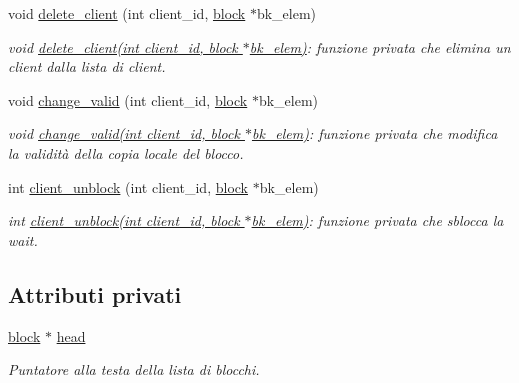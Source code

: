 \begin{CompactItemize}
void \hyperlink{classServer_5e5b37ba00ab28b4a1d1ed83bbc16e6b_5e5b37ba00ab28b4a1d1ed83bbc16e6b}{delete\_\-client} (int client\_\-id, \hyperlink{structblock}{block} $\ast$bk\_\-elem)
\begin{CompactList}\small\item\em void \hyperlink{classServer_5e5b37ba00ab28b4a1d1ed83bbc16e6b_5e5b37ba00ab28b4a1d1ed83bbc16e6b}{delete\_\-client(int client\_\-id, block $\ast$bk\_\-elem)}: funzione privata che elimina un client dalla lista di client. \item\end{CompactList}\item 
void \hyperlink{classServer_e44ebbcc399725c379202cee043a468d_e44ebbcc399725c379202cee043a468d}{change\_\-valid} (int client\_\-id, \hyperlink{structblock}{block} $\ast$bk\_\-elem)
\begin{CompactList}\small\item\em void \hyperlink{classServer_e44ebbcc399725c379202cee043a468d_e44ebbcc399725c379202cee043a468d}{change\_\-valid(int client\_\-id, block $\ast$bk\_\-elem)}: funzione privata che modifica la validità della copia locale del blocco. \item\end{CompactList}\item 
int \hyperlink{classServer_3303875bf7d4884a73d723e232fd927d_3303875bf7d4884a73d723e232fd927d}{client\_\-unblock} (int client\_\-id, \hyperlink{structblock}{block} $\ast$bk\_\-elem)
\begin{CompactList}\small\item\em int \hyperlink{classServer_3303875bf7d4884a73d723e232fd927d_3303875bf7d4884a73d723e232fd927d}{client\_\-unblock(int client\_\-id, block $\ast$bk\_\-elem)}: funzione privata che sblocca la wait. \item\end{CompactList}\end{CompactItemize}
\subsection*{Attributi privati}
\begin{CompactItemize}
\item 
\hyperlink{structblock}{block} $\ast$ \hyperlink{classServer_43ed3b1c5ed34934f250f28eb58cc85c_43ed3b1c5ed34934f250f28eb58cc85c}{head}
\begin{CompactList}\small\item\em Puntatore alla testa della lista di blocchi. \item\end{CompactList}\end{CompactItemize}


